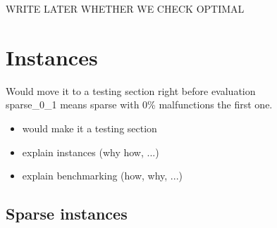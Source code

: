 \documentclass{llncs}
\begin{document}
WRITE LATER WHETHER WE CHECK OPTIMAL


\section{Instances}
\color{green} Would move it to a testing section right before evaluation \color{black}\\
sparse\_0\_1 means sparse with 0\% malfunctions the first one.
\color{blue}
\begin{itemize}
	\item would make it a testing section
	\item explain instances (why how, ...)
	\item explain benchmarking (how, why, ...)
\end{itemize}
\color{black}

\subsection{Sparse instances}
\end{document}
